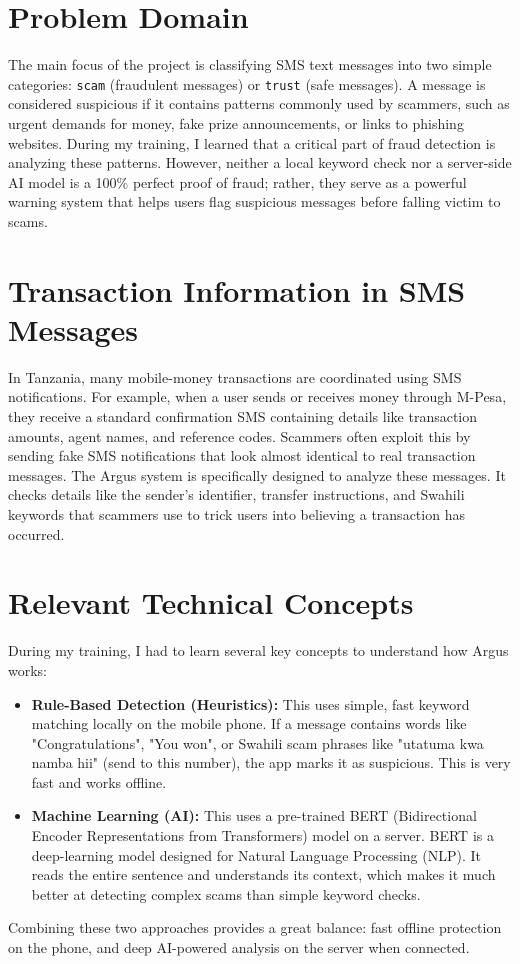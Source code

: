 \section{Problem Domain}
The main focus of the project is classifying SMS text messages into two simple categories: \texttt{scam} (fraudulent messages) or \texttt{trust} (safe messages). 
A message is considered suspicious if it contains patterns commonly used by scammers, such as urgent demands for money, fake prize announcements, or links to phishing websites. During my training, I learned that a critical part of fraud detection is analyzing these patterns. However, neither a local keyword check nor a server-side AI model is a 100\% perfect proof of fraud; rather, they serve as a powerful warning system that helps users flag suspicious messages before falling victim to scams.

\section{Transaction Information in SMS Messages}
In Tanzania, many mobile-money transactions are coordinated using SMS notifications. For example, when a user sends or receives money through M-Pesa, they receive a standard confirmation SMS containing details like transaction amounts, agent names, and reference codes. Scammers often exploit this by sending fake SMS notifications that look almost identical to real transaction messages. 
The Argus system is specifically designed to analyze these messages. It checks details like the sender's identifier, transfer instructions, and Swahili keywords that scammers use to trick users into believing a transaction has occurred.

\section{Relevant Technical Concepts}
During my training, I had to learn several key concepts to understand how Argus works:
\begin{itemize}
  \item \textbf{Rule-Based Detection (Heuristics):} This uses simple, fast keyword matching locally on the mobile phone. If a message contains words like "Congratulations", "You won", or Swahili scam phrases like "utatuma kwa namba hii" (send to this number), the app marks it as suspicious. This is very fast and works offline.
  \item \textbf{Machine Learning (AI):} This uses a pre-trained BERT (Bidirectional Encoder Representations from Transformers) model on a server. BERT is a deep-learning model designed for Natural Language Processing (NLP). It reads the entire sentence and understands its context, which makes it much better at detecting complex scams than simple keyword checks.
\end{itemize}
Combining these two approaches provides a great balance: fast offline protection on the phone, and deep AI-powered analysis on the server when connected.

